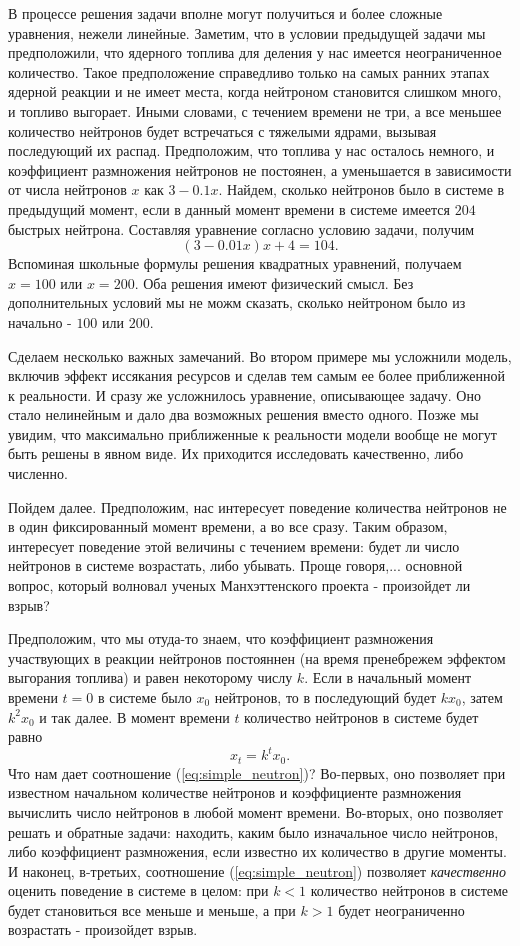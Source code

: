В процессе решения задачи вполне могут получиться и более сложные уравнения, нежели линейные.
Заметим, что в условии предыдущей задачи мы предположили, что ядерного топлива для деления у нас имеется неограниченное количество.
Такое предположение справедливо только на самых ранних этапах ядерной реакции и не имеет места, когда нейтроном становится слишком много, и топливо выгорает.
Иными словами, с течением времени не три, а все меньшее количество нейтронов будет встречаться с тяжелыми ядрами, вызывая последующий их распад.
Предположим, что топлива у нас осталось немного, и коэффициент размножения нейтронов не постоянен, а уменьшается в зависимости от числа нейтронов $x$ как $3 - 0.1x$. 
Найдем, сколько нейтронов было в системе в предыдущий момент, если в данный момент времени в системе имеется $204$ быстрых нейтрона.
Составляя уравнение согласно условию задачи, получим
$$
(3 - 0.01x)x + 4 = 104.
$$
Вспоминая школьные формулы решения квадратных уравнений, получаем $x = 100$ или $x = 200$.
Оба решения имеют физический смысл.
Без дополнительных условий мы не можм сказать, сколько нейтроном было из начально - $100$ или $200$.

Сделаем несколько важных замечаний. 
Во втором примере мы усложнили модель, включив эффект иссякания ресурсов и сделав тем самым ее более приближенной к реальности.
И сразу же усложнилось уравнение, описывающее задачу.
Оно стало нелинейным и дало два возможных решения вместо одного.
Позже мы увидим, что максимально приближенные к реальности модели вообще не могут быть решены в явном виде.
Их приходится исследовать качественно, либо численно.

Пойдем далее.
Предположим, нас интересует поведение количества нейтронов не в один фиксированный момент времени, а во все сразу.
Таким образом, интересует поведение этой величины с течением времени: будет ли число нейтронов в системе возрастать, либо убывать.
Проще говоря,... основной вопрос, который волновал ученых Манхэттенского проекта - произойдет ли взрыв?

Предположим, что мы отуда-то знаем, что коэффициент размножения участвующих в реакции нейтронов постояннен (на время пренебрежем эффектом выгорания топлива) и равен некоторому числу $k$.
Если в начальный момент времени $t=0$ в системе было $x_0$ нейтронов, то в последующий будет $kx_0$, затем $k^2x_0$ и так далее.
В момент времени $t$ количество нейтронов в системе будет равно
\begin{equation}\label{eq:simple_neutron}
x_t = k^tx_0.
\end{equation} 
Что нам дает соотношение (\ref{eq:simple_neutron})?
Во-первых, оно позволяет при известном начальном количестве нейтронов и коэффициенте размножения вычислить число нейтронов в любой момент времени.
Во-вторых, оно позволяет решать и обратные задачи: находить, каким было изначальное число нейтронов, либо коэффициент размножения, если известно их количество в другие моменты.
И наконец, в-третьих, соотношение (\ref{eq:simple_neutron}) позволяет \textit{качественно} оценить поведение в системе в целом: при $k<1$ количество нейтронов в системе будет становиться все меньше и меньше, а при $k>1$ будет неограниченно возрастать - произойдет взрыв.

